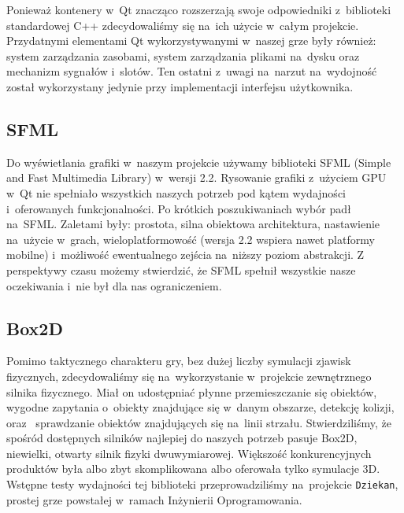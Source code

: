\documentclass[licencjacka]{pracamgr}
\begin{document}
      Ponieważ kontenery w~Qt znacząco rozszerzają swoje odpowiedniki z~biblioteki standardowej C++ zdecydowaliśmy się na~ich użycie
      w~całym projekcie. Przydatnymi elementami Qt wykorzystywanymi w~naszej grze były również: system zarządzania zasobami,
      system zarządzania plikami na~dysku oraz~ mechanizm sygnałów i~slotów. Ten ostatni z~uwagi na~narzut na~wydojność został 
      wykorzystany jedynie przy implementacji interfejsu użytkownika.

    \subsection{SFML}
      Do wyświetlania grafiki w~naszym projekcie używamy biblioteki SFML\cite{SFML} (Simple and Fast Multimedia Library) w~wersji
      2.2. Rysowanie grafiki z~użyciem GPU w~Qt nie spełniało wszystkich naszych potrzeb pod kątem wydajności i~oferowanych funkcjonalności.
      Po krótkich poszukiwaniach wybór padł na~SFML. Zaletami były: prostota, silna obiektowa architektura, nastawienie na~użycie w~grach,
      wieloplatformowość (wersja 2.2 wspiera nawet platformy mobilne) i~możliwość ewentualnego zejścia na~niższy poziom abstrakcji.
      Z perspektywy czasu możemy stwierdzić, że SFML spełnił wszystkie nasze oczekiwania i~nie był dla nas ograniczeniem.

    \subsection{Box2D}
      Pomimo taktycznego charakteru gry, bez dużej liczby symulacji zjawisk fizycznych, zdecydowaliśmy się na~wykorzystanie
      w~projekcie zewnętrznego silnika fizycznego. Miał on udostępniać płynne przemieszczanie się obiektów, wygodne
      zapytania o~obiekty znajdujące się w~danym obszarze, detekcję kolizji, oraz~ sprawdzanie obiektów znajdujących się na~linii
      strzału. Stwierdziliśmy, że spośród dostępnych silników najlepiej do naszych potrzeb pasuje Box2D\cite{BOX}, niewielki,
      otwarty silnik fizyki dwuwymiarowej. Większość konkurencyjnych produktów była albo zbyt skomplikowana albo oferowała tylko
      symulacje 3D. Wstępne testy wydajności tej biblioteki przeprowadziliśmy na~projekcie \texttt{Dziekan}, prostej grze powstałej
      w~ramach Inżynierii Oprogramowania.
\end{document}
